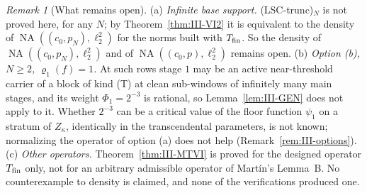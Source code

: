 \documentclass[10pt]{amsart}
\theoremstyle{definition}
\theoremstyle{remark}
\newtheorem{remark}[theorem]{Remark}
\newcommand{\NA}{\operatorname{NA}}
\begin{document}
\begin{remark}[What remains open]\label{rem:III-MTVIopen}
(a) \emph{Infinite base support.}  (LSC-trunc)$_N$ is not proved here, for any
$N$; by Theorem~\ref{thm:III-VI2} it is equivalent to the density of
$\NA((c_0,p_N),\ell_2^2)$ for the norms built with $T_{\rm fin}$.  So the density
of $\NA((c_0,p_N),\ell_2^2)$ and of $\NA((c_0,p),\ell_2^2)$ remains open.
(b) \emph{Option (b), $N\ge2$, $\varrho_1(f)=1$.}  At such rows stage $1$ may be an
active near-threshold carrier of a block of kind (T) at clean sub-windows of
infinitely many main stages, and its weight $\Phi_1=2^{-3}$ is rational, so
Lemma~\ref{lem:III-GEN} does not apply to it.  Whether $2^{-3}$ can be a critical
value of the floor function $\psi_1$ on a stratum of $Z_\kappa$, identically in the
transcendental parameters, is not known; normalizing the operator of option
(a) does not help (Remark~\ref{rem:III-options}).
(c) \emph{Other operators.}  Theorem~\ref{thm:III-MTVI} is proved for the designed
operator $T_{\rm fin}$ only, not for an arbitrary admissible operator of
Mart\'in's Lemma~B.
No counterexample to density is claimed, and none of the verifications
produced one.
\end{remark}
\end{document}

